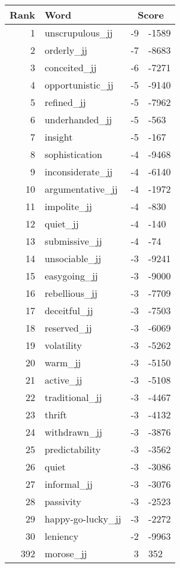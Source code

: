 \begin{longtable}[!htbp]{| rlr@{.}l |}
    \hline
    \textbf{Rank} & \textbf{Word} & \multicolumn{2}{c|}{\textbf{Score}} \\
    \hline
    \endhead
    1 & unscrupulous\_jj & -9 & -1589 \\
    2 & orderly\_jj & -7 & -8683 \\
    3 & conceited\_jj & -6 & -7271 \\
    4 & opportunistic\_jj & -5 & -9140 \\
    5 & refined\_jj & -5 & -7962 \\
    6 & underhanded\_jj & -5 & -563 \\
    7 & insight & -5 & -167 \\
    8 & sophistication & -4 & -9468 \\
    9 & inconsiderate\_jj & -4 & -6140 \\
    10 & argumentative\_jj & -4 & -1972 \\
    11 & impolite\_jj & -4 & -830 \\
    12 & quiet\_jj & -4 & -140 \\
    13 & submissive\_jj & -4 & -74 \\
    14 & unsociable\_jj & -3 & -9241 \\
    15 & easygoing\_jj & -3 & -9000 \\
    16 & rebellious\_jj & -3 & -7709 \\
    17 & deceitful\_jj & -3 & -7503 \\
    18 & reserved\_jj & -3 & -6069 \\
    19 & volatility & -3 & -5262 \\
    20 & warm\_jj & -3 & -5150 \\
    21 & active\_jj & -3 & -5108 \\
    22 & traditional\_jj & -3 & -4467 \\
    23 & thrift & -3 & -4132 \\
    24 & withdrawn\_jj & -3 & -3876 \\
    25 & predictability & -3 & -3562 \\
    26 & quiet & -3 & -3086 \\
    27 & informal\_jj & -3 & -3076 \\
    28 & passivity & -3 & -2523 \\
    29 & happy-go-lucky\_jj & -3 & -2272 \\
    30 & leniency & -2 & -9963 \\
    392 & morose\_jj & 3 & 352 \\

\end{longtable}
